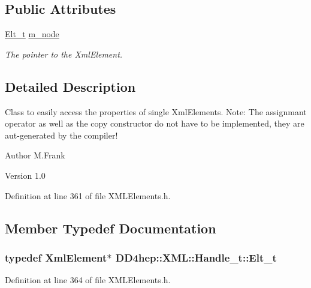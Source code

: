 \subsection*{Public Attributes}
\begin{DoxyCompactItemize}
\item 
\hyperlink{class_d_d4hep_1_1_x_m_l_1_1_handle__t_a81a72155f29971b37652430a334a6b30}{Elt\_\-t} \hyperlink{class_d_d4hep_1_1_x_m_l_1_1_handle__t_afa133bf6ff332a64464594429061f036}{m\_\-node}
\begin{DoxyCompactList}\small\item\em The pointer to the XmlElement. \item\end{DoxyCompactList}\end{DoxyCompactItemize}


\subsection{Detailed Description}
Class to easily access the properties of single XmlElements. Note: The assignmant operator as well as the copy constructor do not have to be implemented, they are aut-\/generated by the compiler!

\begin{DoxyAuthor}{Author}
M.Frank 
\end{DoxyAuthor}
\begin{DoxyVersion}{Version}
1.0 
\end{DoxyVersion}


Definition at line 361 of file XMLElements.h.

\subsection{Member Typedef Documentation}
\hypertarget{class_d_d4hep_1_1_x_m_l_1_1_handle__t_a81a72155f29971b37652430a334a6b30}{
\subsubsection[{Elt\_\-t}]{\setlength{\rightskip}{0pt plus 5cm}typedef XmlElement$\ast$ {\bf DD4hep::XML::Handle\_\-t::Elt\_\-t}}}
\label{class_d_d4hep_1_1_x_m_l_1_1_handle__t_a81a72155f29971b37652430a334a6b30}


Definition at line 364 of file XMLElements.h.

